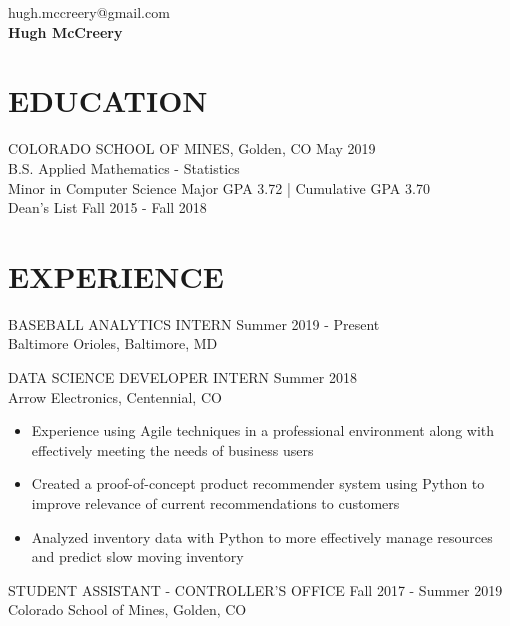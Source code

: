 \documentclass[11pt]{res} %
\begin{document}
 
\begin{multicols}{3}
\noindent \raggedright{hugh.mccreery@gmail.com}\\ \textbf{\LARGE Hugh McCreery}\\ 
\end{multicols}
\vspace{-0.4in}
\begin{resume}
\vspace{-0.2in}
\hrulefill
\vspace{-0.2in}                                  
\section{EDUCATION} 
 \noindent COLORADO SCHOOL OF MINES, Golden, CO \hfill May 2019 \\
B.S. Applied Mathematics - Statistics \\
Minor in Computer Science \hfill Major GPA 3.72 | Cumulative GPA 3.70	\\
Dean's List \hfill Fall 2015 - Fall 2018 \\
\vspace{-0.1in}
\hrulefill
\vspace{-0.1in}  
\section{EXPERIENCE} 
BASEBALL ANALYTICS INTERN \hfill Summer 2019 - Present	\\
Baltimore Orioles, Baltimore, MD

DATA SCIENCE DEVELOPER INTERN \hfill Summer 2018 \\
Arrow Electronics, Centennial, CO

\begin{itemize}
	\item Experience using Agile techniques in a professional environment along with effectively meeting the needs of business users
	\item Created a proof-of-concept product recommender system using Python to improve relevance of current recommendations to customers
	\item Analyzed inventory data with Python to more effectively manage resources and predict slow moving inventory
\end{itemize}
\vspace{-0.15in}  
STUDENT ASSISTANT - CONTROLLER'S OFFICE \hfill Fall 2017 - Summer 2019 \\
Colorado School of Mines, Golden, CO 


\end{resume}
\end{document}
